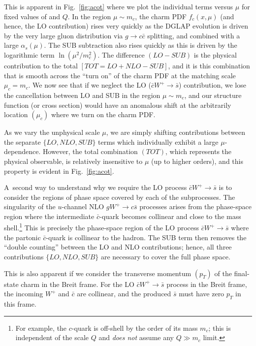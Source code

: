 This is apparent in Fig.~\ref{fig:acot} where we plot the individual
terms versus $\mu$ for fixed values of \xbj and $Q$. In the region
$\mu\sim m_{c}$, the charm PDF $f_{c}(x,\mu)$ (and hence, the LO
contribution) rises very quickly as the DGLAP evolution is driven by
the very large gluon distribution via $g\to c\bar{c}$ splitting, and
combined with a large $\alpha_{s}(\mu)$. The SUB subtraction also
rises quickly as this is driven by the logarithmic term
$\ln(\mu^{2}/m_{c}^{2})$. The difference \mbox{$(LO-SUB)$} is the
physical contribution to the total \mbox{$[TOT=LO+NLO-SUB]$}, and it
is this combination that is smooth across the ``turn on'' of the
charm PDF at the matching scale $\mu_{c}=m_{c}$.  We now see that if
we neglect the LO \mbox{($\bar{c}W^{+}\to\bar{s}$)} contribution, we
lose the cancellation between LO and SUB in the region
$\mu\sim m_{c}$, and our structure function (or cross section) would
have an anomalous shift at the arbitrarily location $(\mu_{c})$ where
we turn on the charm PDF.

As we vary the unphysical scale $\mu$, we are simply shifting
contributions between the separate \mbox{$\{LO,NLO,SUB\}$} terms which
individually exhibit a large $\mu$-dependence. However, the total
combination $(TOT)$, which represents the physical observable, is
relatively insensitive to $\mu$ (up to higher orders), and this
property is evident in Fig.~\ref{fig:acot}.

%
A~second way to understand why we require the LO process
\mbox{$\bar{c}W^{+}\to\bar{s}$} is to consider the regions of phase
space covered by each of the subprocesses. The singularity of the
$u$-channel NLO \mbox{$gW^{+}\to c\bar{s}$} processes arises from the
phase-space region where the intermediate $\bar{c}$-quark becomes
collinear and close to the mass shell.\footnote{For example, the
  $c$-quark is off-shell by the order of its mass $m_{c}$; this is
  independent of the scale $Q$ and \textit{does not} assume any
  $Q\gg m_{c}$ limit.} This is precisely the phase-space region of the
LO process \mbox{$\bar{c}W^{+}\to\bar{s}$} where the partonic
$\bar{c}$-quark is collinear to the hadron. The SUB term then removes
the ``double counting'' between the LO and NLO contributions; hence,
all three contributions \mbox{$\{LO,NLO,SUB\}$} are necessary to cover
the full phase space.

This is also apparent if we consider the transverse momentum $(p_{T})$
of the final-state charm in the Breit frame. For the LO
\mbox{$\bar{c}W^{+}\to\bar{s}$} process in the Breit frame, the
incoming $W^{+}$ and $\bar{c}$ are collinear, and the produced
$\bar{s}$ must have zero $p_{T}$ in this frame.

